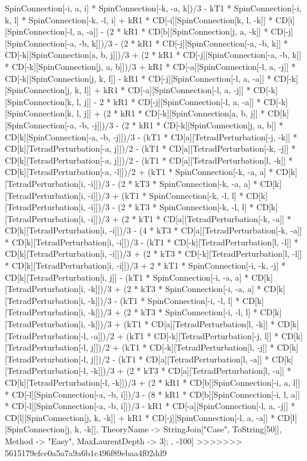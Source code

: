 SpinConnection[-i, a, i] * SpinConnection[-k, -a, k])/3 - kT1 * SpinConnection[-i, k, l] * SpinConnection[-k, -l, i] + kR1 * CD[-i][SpinConnection[k, l, -k]] * CD[i][SpinConnection[-l, a, -a]] - (2 * kR1 * CD[b][SpinConnection[j, a, -k]] * CD[-j][SpinConnection[-a, -b, k]])/3 - (2 * kR1 * CD[-j][SpinConnection[-a, -b, k]] * CD[-k][SpinConnection[a, b, j]])/3 + (2 * kR1 * CD[-j][SpinConnection[-a, -b, k]] * CD[-k][SpinConnection[j, a, b]])/3 + kR1 * CD[-a][SpinConnection[-l, a, -j]] * CD[-k][SpinConnection[j, k, l]] - kR1 * CD[-j][SpinConnection[-l, a, -a]] * CD[-k][SpinConnection[j, k, l]] + kR1 * CD[-a][SpinConnection[-l, a, -j]] * CD[-k][SpinConnection[k, l, j]] - 2 * kR1 * CD[-j][SpinConnection[-l, a, -a]] * CD[-k][SpinConnection[k, l, j]] + (2 * kR1 * CD[-k][SpinConnection[a, b, j]] * CD[k][SpinConnection[-a, -b, -j]])/3 - (2 * kR1 * CD[-k][SpinConnection[j, a, b]] * CD[k][SpinConnection[-a, -b, -j]])/3 - (kT1 * CD[a][TetradPerturbation[-j, -k]] * CD[k][TetradPerturbation[-a, j]])/2 - (kT1 * CD[a][TetradPerturbation[-k, -j]] * CD[k][TetradPerturbation[-a, j]])/2 - (kT1 * CD[a][TetradPerturbation[l, -k]] * CD[k][TetradPerturbation[-a, -l]])/2 + (kT1 * SpinConnection[-k, -a, a] * CD[k][TetradPerturbation[i, -i]])/3 - (2 * kT3 * SpinConnection[-k, -a, a] * CD[k][TetradPerturbation[i, -i]])/3 + (kT1 * SpinConnection[-k, -l, l] * CD[k][TetradPerturbation[i, -i]])/3 - (2 * kT3 * SpinConnection[-k, -l, l] * CD[k][TetradPerturbation[i, -i]])/3 + (2 * kT1 * CD[a][TetradPerturbation[-k, -a]] * CD[k][TetradPerturbation[i, -i]])/3 - (4 * kT3 * CD[a][TetradPerturbation[-k, -a]] * CD[k][TetradPerturbation[i, -i]])/3 - (kT1 * CD[-k][TetradPerturbation[l, -l]] * CD[k][TetradPerturbation[i, -i]])/3 + (2 * kT3 * CD[-k][TetradPerturbation[l, -l]] * CD[k][TetradPerturbation[i, -i]])/3 + 2 * kT1 * SpinConnection[-i, -k, -j] * CD[k][TetradPerturbation[i, j]] - (kT1 * SpinConnection[-i, -a, a] * CD[k][TetradPerturbation[i, -k]])/3 + (2 * kT3 * SpinConnection[-i, -a, a] * CD[k][TetradPerturbation[i, -k]])/3 - (kT1 * SpinConnection[-i, -l, l] * CD[k][TetradPerturbation[i, -k]])/3 + (2 * kT3 * SpinConnection[-i, -l, l] * CD[k][TetradPerturbation[i, -k]])/3 + (kT1 * CD[a][TetradPerturbation[l, -k]] * CD[k][TetradPerturbation[-l, -a]])/2 + (kT1 * CD[-k][TetradPerturbation[-j, l]] * CD[k][TetradPerturbation[-l, j]])/2 + (kT1 * CD[-k][TetradPerturbation[l, -j]] * CD[k][TetradPerturbation[-l, j]])/2 - (kT1 * CD[a][TetradPerturbation[l, -a]] * CD[k][TetradPerturbation[-l, -k]])/3 + (2 * kT3 * CD[a][TetradPerturbation[l, -a]] * CD[k][TetradPerturbation[-l, -k]])/3 + (2 * kR1 * CD[b][SpinConnection[-i, a, l]] * CD[-l][SpinConnection[-a, -b, i]])/3 - (8 * kR1 * CD[b][SpinConnection[-i, l, a]] * CD[-l][SpinConnection[-a, -b, i]])/3 - kR1 * CD[-a][SpinConnection[-l, a, -j]] * CD[l][SpinConnection[j, k, -k]] + kR1 * CD[-j][SpinConnection[-l, a, -a]] * CD[l][SpinConnection[j, k, -k]], TheoryName -> StringJoin["Case", ToString[50]], Method -> "Easy", MaxLaurentDepth -> 3]; , -100]
>>>>>>> 5615179efce0a5a7a9a6b1c496f89ebaa4f02dd9
